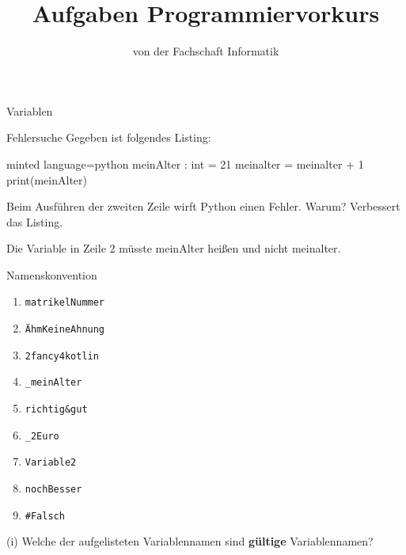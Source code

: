 
\title{Aufgaben Programmiervorkurs}
\subtitle{von der Fachschaft Informatik\hfill\ptitle}

\usepackage{enumitem}


\maketitle{}

\begin{task}[points=auto]{Variablen }
    \begin{subtask*}[points=0]{Fehlersuche}
        Gegeben ist folgendes Listing:
        \begin{codeBlock}[]{minted language=python}
            meinAlter : int = 21
            meinalter = meinalter + 1
            print(meinAlter)
        \end{codeBlock}
        Beim Ausführen der zweiten Zeile wirft Python einen Fehler. Warum? Verbessert das Listing.
        \begin{solution}
            Die Variable in Zeile 2 müsste {\ttfamily meinAlter} heißen und nicht {\ttfamily meinalter}.
        \end{solution}
    \end{subtask*}
    \begin{subtask*}[points=0]{Namenskonvention}
        \begin{multicols}{3}
            \begin{enumerate}[label=(\alph*)]
                \item \texttt{matrikelNummer}
                \item \texttt{ÄhmKeineAhnung}
                \item \texttt{2fancy4kotlin}
                \item \texttt{_meinAlter}
                \item \texttt{richtig&gut}
                \item \texttt{_2Euro}
                \item \texttt{Variable2}
                \item \texttt{nochBesser}
                \item \texttt{#Falsch}
            \end{enumerate}
        \end{multicols}
        (i) Welche der aufgelisteten Variablennamen sind \textbf{gültige} Variablennamen?


\end{subtask*}
\end{task}
